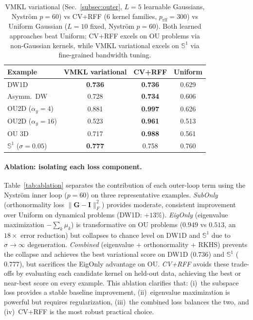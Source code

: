 \documentclass[11pt]{article}
\theoremstyle{remark}
\begin{document}
\begin{table}[t]
\centering
\begin{tabular}{lccc}
\toprule
Example & VMKL variational & CV+RFF & Uniform \\
\midrule
DW1D & \textbf{0.736} & \textbf{0.736} & 0.629 \\
Asymm.\ DW & 0.728 & \textbf{0.734} & 0.606 \\
OU2D ($\alpha_y\!=\!4$) & 0.881 & \textbf{0.997} & 0.626 \\
OU2D ($\alpha_y\!=\!16$) & 0.523 & \textbf{0.961} & 0.513 \\
OU 3D & 0.717 & \textbf{0.988} & 0.561 \\
$\mathbb{S}^1$ ($\sigma\!=\!0.05$) & \textbf{0.777} & 0.758 & 0.760 \\
\bottomrule
\end{tabular}
\caption{VMKL variational (Sec.~\ref{subsec:outer}, $L\!=\!5$ learnable Gaussians, Nystr\"om $p\!=\!60$) vs CV+RFF (6 kernel families, $p_{\mathrm{rff}}\!=\!300$) vs Uniform Gaussian ($L\!=\!10$ fixed, Nystr\"om $p\!=\!60$). Both learned approaches beat Uniform; CV+RFF excels on OU problems via non-Gaussian kernels, while VMKL variational excels on $\mathbb{S}^1$ via fine-grained bandwidth tuning.}
\label{tab:vmkl-vs-cv}
\end{table}

\paragraph{Ablation: isolating each loss component.}
Table~\ref{tab:ablation} separates the contribution of each outer-loop term using the Nystr\"om inner loop ($p=60$) on three representative examples.
\emph{SubOnly} (orthonormality loss $\|\mathbf{G}-\mathbf{I}\|_F^2$) provides moderate, consistent improvement over Uniform on dynamical problems (DW1D: $+13\%$).
\emph{EigOnly} (eigenvalue maximization $-\sum_k \mu_k$) is transformative on OU problems ($0.949$ vs $0.513$, an $18\times$ error reduction) but collapses to chance level on DW1D and $\mathbb{S}^1$ due to $\sigma\to\infty$ degeneration.
\emph{Combined} (eigenvalue + orthonormality + RKHS) prevents the collapse and achieves the best variational score on DW1D ($0.736$) and $\mathbb{S}^1$ ($0.777$), but sacrifices the EigOnly advantage on OU.
\emph{CV+RFF} avoids these trade-offs by evaluating each candidate kernel on held-out data, achieving the best or near-best score on every example.
This ablation clarifies that: (i)~the subspace loss provides a stable baseline improvement, (ii)~eigenvalue maximization is powerful but requires regularization, (iii)~the combined loss balances the two, and (iv)~CV+RFF is the most robust practical choice.
\end{document}
